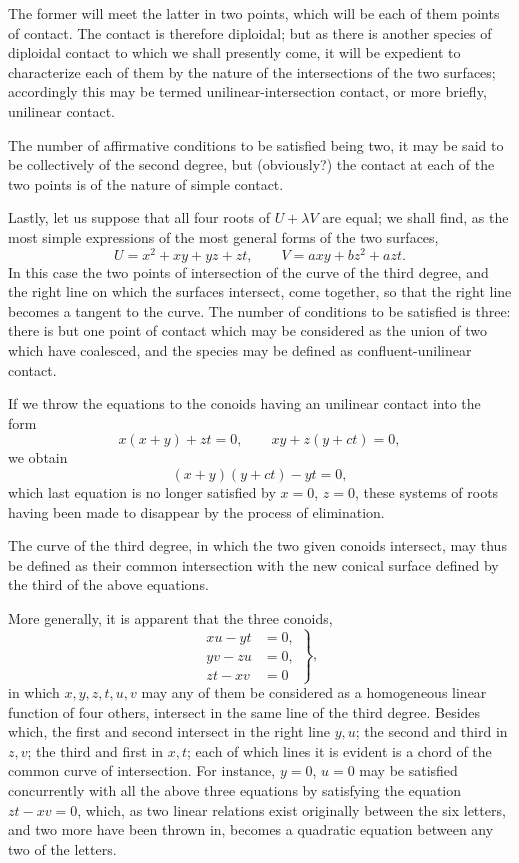 \documentclass[11pt]{article}
\newcommand{\sourcepage}[1]{\marginpar{\scriptsize p.~#1}}
\begin{document}
{{The former will meet the latter in two points, which will be each of them points of contact. The contact is therefore diploidal; but as there is another species of diploidal contact to which we shall presently come, it will be expedient to characterize each of them by the nature of the intersections of the two surfaces; accordingly this may be termed unilinear-intersection contact, or more briefly, unilinear contact.

The number of affirmative conditions to be satisfied being two, it may be said to be collectively of the second degree, but (obviously?) the contact at each of the two points is of the nature of simple contact.

Lastly, let us suppose that all four roots of $U+\lambda V$ are equal; we shall find, as the most simple expressions of the most general forms of the two surfaces,
\[
U=x^2+xy+yz+zt,
\qquad
V=axy+bz^2+azt.
\]
In this case the two points of intersection of the curve of the third degree, and the right line on which the surfaces intersect, come together, so that the right line becomes a tangent to the curve. The number of conditions to be satisfied is three: there is but one point of contact which may be considered as the union of two which have coalesced, and the species may be defined as confluent-unilinear contact.

If we throw the equations to the conoids having an unilinear contact into the form
\[
x(x+y)+zt=0,
\qquad
xy+z(y+ct)=0,
\]
we obtain
\[
(x+y)(y+ct)-yt=0,
\]
which last equation is no longer satisfied by $x=0$, $z=0$, these systems of roots having been made to disappear by the process of elimination.

The curve of the third degree, in which the two given conoids intersect, may thus be defined as their common intersection with the new conical surface defined by the third of the above equations.

\sourcepage{229}
More generally, it is apparent that the three conoids,
\[
\left.\begin{aligned}
xu-yt&=0,\\
yv-zu&=0,\\
zt-xv&=0
\end{aligned}\right\},
\]
in which $x,y,z,t,u,v$ may any of them be considered as a homogeneous linear function of four others, intersect in the same line of the third degree. Besides which, the first and second intersect in the right line $y,u$; the second and third in $z,v$; the third and first in $x,t$; each of which lines it is evident is a chord of the common curve of intersection. For instance, $y=0$, $u=0$ may be satisfied concurrently with all the above three equations by satisfying the equation $zt-xv=0$, which, as two linear relations exist originally between the six letters, and two more have been thrown in, becomes a quadratic equation between any two of the letters.

}}
\end{document}
